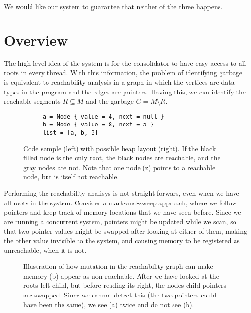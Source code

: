 We would like our system to guarantee that neither of the three happens.

\section{Overview\label{sec:cmr-overview}}

The high level idea of the system is for the consolidator to have easy access to all roots in every
thread. With this information, the problem of identifying garbage is equivalent to reachability
analysis in a graph in which the vertices are data types in the program and the edges are pointers.
 Having this, we can
identify the reachable segments $R \subseteq M$ and the garbage $G = M \setminus R$.

\begin{figure}[ht]
  \centering
  \begin{subfigure}{0.45\textwidth}
    \begin{lstlisting}
a = Node { value = 4, next = null }
b = Node { value = 8, next = a }
list = [a, b, 3]
    \end{lstlisting}
  \end{subfigure}
  \hfill
  \begin{subfigure}{0.45\textwidth}
    
  \end{subfigure}
  \caption{Code sample (left) with possible heap layout (right). If the black filled node is the
  only root, the black nodes are reachable, and the gray nodes are not. Note that one node (z)
  points to a reachable node, but is itself not reachable.}
\end{figure}

Performing the reachability analisys is not straight forwars, even when we have all roots in the
system. Consider a mark-and-sweep approach, where we follow pointers and keep track of memory
locations that we have seen before. Since we are running a concurrent system, pointers might be
updated while we scan, so that two pointer values might be swapped after looking at either of them,
making the other value invisible to the system, and causing memory to be registered as unreachable,
when it is not.

\begin{figure}[ht]
  \centering
  
  \caption{Illustration of how mutation in the reachability graph can make memory (b) appear as
  non-reachable. After we have looked at the roots left child, but before reading its right, the
  nodes child pointers are swapped. Since we cannot detect this (the two pointers could have been
  the same), we see (a) twice and do not see (b).}
\end{figure}

